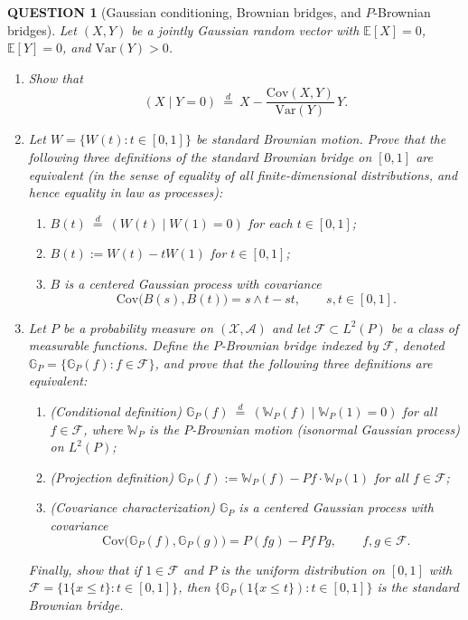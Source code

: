 \documentclass[12pt]{article}
\renewcommand{\(}{\left(}%
\renewcommand{\)}{\right)}%
\renewcommand{\[}{\left[}%
\renewcommand{\]}{\right]}%
\newtheorem{question}{QUESTION}[section]}
\begin{document}
\begin{question}[Gaussian conditioning, Brownian bridges, and $P$-Brownian bridges]
Let $(X,Y)$ be a jointly Gaussian random vector with $\mathbb E[X]=0$, $\mathbb E[Y]=0$, and $\mathrm{Var}(Y)>0$.  

\begin{enumerate}
\item Show that
\begin{equation*}
(X \mid Y=0)\ \stackrel{d}{=}\ X-\frac{\mathrm{Cov}(X,Y)}{\mathrm{Var}(Y)}\,Y.
\end{equation*}

\item Let $W=\{W(t):t\in[0,1]\}$ be standard Brownian motion. Prove that the following three definitions of the standard Brownian bridge on $[0,1]$ are equivalent (in the sense of equality of all finite-dimensional distributions, and hence equality in law as processes):
\begin{enumerate}
\item[(i)] $B(t)\ \stackrel{d}{=}\ (W(t)\mid W(1)=0)$ for each $t\in[0,1]$;
\item[(ii)] $B(t):=W(t)-tW(1)$ for $t\in[0,1]$;
\item[(iii)] $B$ is a centered Gaussian process with covariance
\begin{equation*}
\mathrm{Cov}\big(B(s),B(t)\big)=s\wedge t-st,\qquad s,t\in[0,1].
\end{equation*}
\end{enumerate}

\item Let $P$ be a probability measure on $(\mathcal X,\mathcal A)$ and let $\mathcal F\subset L^2(P)$ be a class of measurable functions. Define the $P$-Brownian bridge indexed by $\mathcal F$, denoted $\mathbb G_P=\{\mathbb G_P(f):f\in\mathcal F\}$, and prove that the following three definitions are equivalent:
\begin{enumerate}
\item[(i)] (Conditional definition) $\mathbb G_P(f)\ \stackrel{d}{=}\ (\mathbb W_P(f)\mid \mathbb W_P(1)=0)$ for all $f\in\mathcal F$, where $\mathbb W_P$ is the $P$-Brownian motion (isonormal Gaussian process) on $L^2(P)$;
\item[(ii)] (Projection definition) $\mathbb G_P(f):=\mathbb W_P(f)-Pf\cdot \mathbb W_P(1)$ for all $f\in\mathcal F$;
\item[(iii)] (Covariance characterization) $\mathbb G_P$ is a centered Gaussian process with covariance
\begin{equation*}
\mathrm{Cov}\big(\mathbb G_P(f),\mathbb G_P(g)\big)=P(fg)-Pf\,Pg,\qquad f,g\in\mathcal F.
\end{equation*}
\end{enumerate}
Finally, show that if $1\in\mathcal F$ and $P$ is the uniform distribution on $[0,1]$ with $\mathcal F=\{1\{x\le t\}:t\in[0,1]\}$, then $\{\mathbb G_P(1\{x\le t\}):t\in[0,1]\}$ is the standard Brownian bridge.
\end{enumerate}
\end{question}
\end{document}

